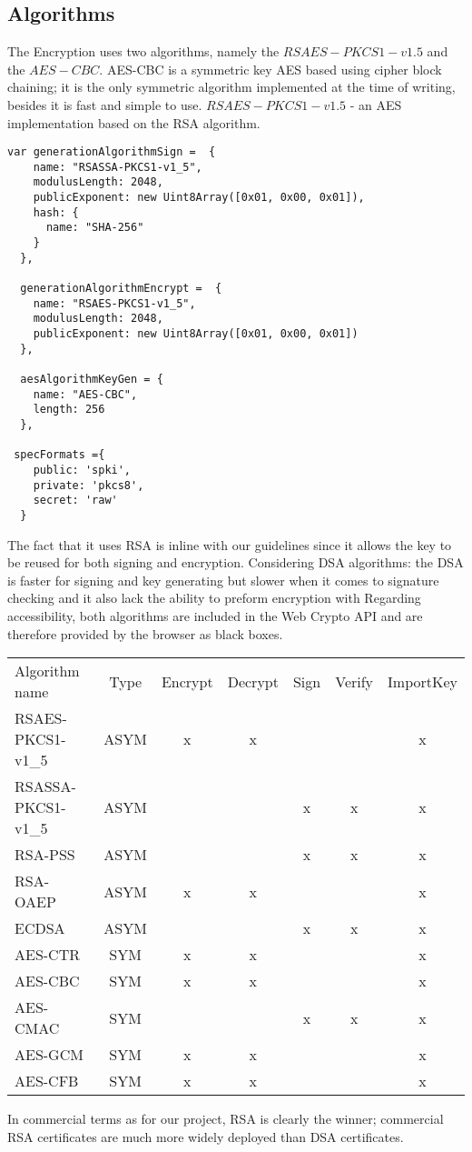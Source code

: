 \subsection{Algorithms}
The Encryption uses two algorithms, namely the $RSAES-PKCS1-v1.5$ and the $AES-CBC$.
AES-CBC is a symmetric key AES based using cipher block chaining; it is the only symmetric algorithm implemented at the time of writing, besides it is fast and simple to use.
$RSAES-PKCS1-v1.5$ - an AES implementation based on the RSA algorithm.
\begin{Code}
\begin{lstlisting}[caption={Common database operations}, label={lst:api}]
  var generationAlgorithmSign =  {
    name: "RSASSA-PKCS1-v1_5",
    modulusLength: 2048,
    publicExponent: new Uint8Array([0x01, 0x00, 0x01]),
    hash: {
      name: "SHA-256"
    }
  },

  generationAlgorithmEncrypt =  {
    name: "RSAES-PKCS1-v1_5",
    modulusLength: 2048,
    publicExponent: new Uint8Array([0x01, 0x00, 0x01])
  },

  aesAlgorithmKeyGen = {
    name: "AES-CBC",
    length: 256
  },

 specFormats ={
    public: 'spki',
    private: 'pkcs8',
    secret: 'raw'
  }
\end{lstlisting}
\end{Code}
The fact that it uses RSA is inline with our guidelines since it allows the key to be reused for both signing and encryption.
Considering DSA algorithms: the DSA is faster for signing and key generating but slower when it comes to signature checking and it also lack the ability to preform encryption with
Regarding accessibility, both algorithms are included in the Web Crypto API and are therefore provided by the browser as black boxes.
\begin{table}[h]
\centering
\begin{tabular}{lcccccc}
Algorithm name & Type & Encrypt & Decrypt & Sign & Verify & ImportKey \\
RSAES-PKCS1-v1\_5 & ASYM & x & x &  &  & x \\
RSASSA-PKCS1-v1\_5 & ASYM &  &  & x & x & x \\
RSA-PSS & ASYM &  &  & x & x & x \\
RSA-OAEP & ASYM & x & x &  &  & x \\
ECDSA & ASYM &  &  & x & x & x \\
AES-CTR & SYM & x & x &  &  & x \\
AES-CBC & SYM & x & x &  &  & x \\
AES-CMAC & SYM &  &  & x & x & x \\
AES-GCM & SYM & x & x &  &  & x \\
AES-CFB & SYM & x & x &  &  & x
\end{tabular}
\end{table}
In commercial terms as for our project, RSA is clearly the winner; commercial RSA certificates are much more widely deployed than DSA certificates.





